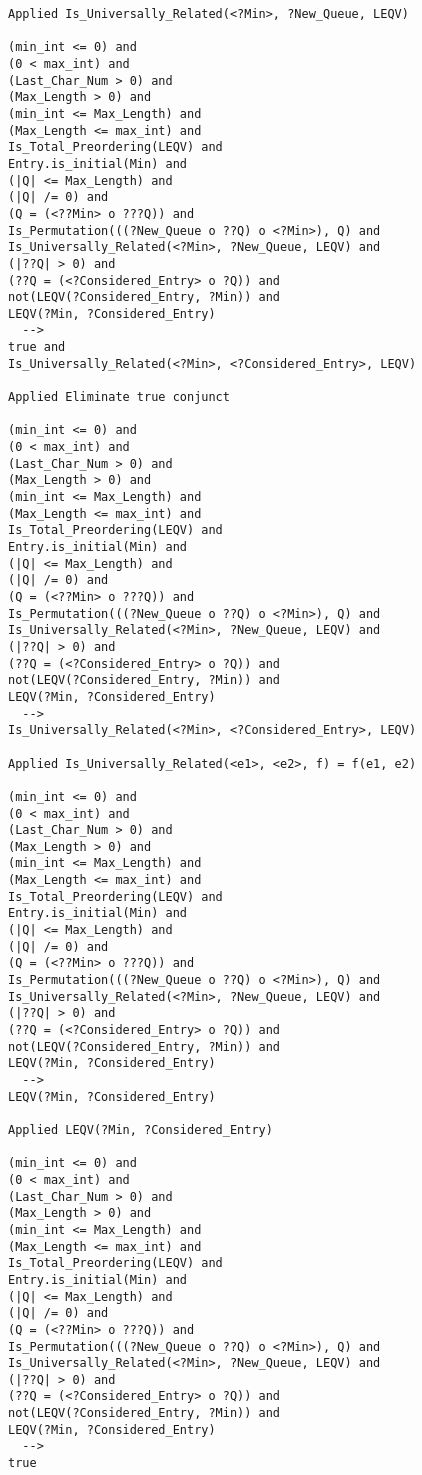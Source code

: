 \begin{lstlisting}[language=resolve]
Applied Is_Universally_Related(<?Min>, ?New_Queue, LEQV)

(min_int <= 0) and
(0 < max_int) and
(Last_Char_Num > 0) and
(Max_Length > 0) and
(min_int <= Max_Length) and
(Max_Length <= max_int) and
Is_Total_Preordering(LEQV) and
Entry.is_initial(Min) and
(|Q| <= Max_Length) and
(|Q| /= 0) and
(Q = (<??Min> o ???Q)) and
Is_Permutation(((?New_Queue o ??Q) o <?Min>), Q) and
Is_Universally_Related(<?Min>, ?New_Queue, LEQV) and
(|??Q| > 0) and
(??Q = (<?Considered_Entry> o ?Q)) and
not(LEQV(?Considered_Entry, ?Min)) and
LEQV(?Min, ?Considered_Entry)
  -->
true and
Is_Universally_Related(<?Min>, <?Considered_Entry>, LEQV)

Applied Eliminate true conjunct

(min_int <= 0) and
(0 < max_int) and
(Last_Char_Num > 0) and
(Max_Length > 0) and
(min_int <= Max_Length) and
(Max_Length <= max_int) and
Is_Total_Preordering(LEQV) and
Entry.is_initial(Min) and
(|Q| <= Max_Length) and
(|Q| /= 0) and
(Q = (<??Min> o ???Q)) and
Is_Permutation(((?New_Queue o ??Q) o <?Min>), Q) and
Is_Universally_Related(<?Min>, ?New_Queue, LEQV) and
(|??Q| > 0) and
(??Q = (<?Considered_Entry> o ?Q)) and
not(LEQV(?Considered_Entry, ?Min)) and
LEQV(?Min, ?Considered_Entry)
  -->
Is_Universally_Related(<?Min>, <?Considered_Entry>, LEQV)

Applied Is_Universally_Related(<e1>, <e2>, f) = f(e1, e2)

(min_int <= 0) and
(0 < max_int) and
(Last_Char_Num > 0) and
(Max_Length > 0) and
(min_int <= Max_Length) and
(Max_Length <= max_int) and
Is_Total_Preordering(LEQV) and
Entry.is_initial(Min) and
(|Q| <= Max_Length) and
(|Q| /= 0) and
(Q = (<??Min> o ???Q)) and
Is_Permutation(((?New_Queue o ??Q) o <?Min>), Q) and
Is_Universally_Related(<?Min>, ?New_Queue, LEQV) and
(|??Q| > 0) and
(??Q = (<?Considered_Entry> o ?Q)) and
not(LEQV(?Considered_Entry, ?Min)) and
LEQV(?Min, ?Considered_Entry)
  -->
LEQV(?Min, ?Considered_Entry)

Applied LEQV(?Min, ?Considered_Entry)

(min_int <= 0) and
(0 < max_int) and
(Last_Char_Num > 0) and
(Max_Length > 0) and
(min_int <= Max_Length) and
(Max_Length <= max_int) and
Is_Total_Preordering(LEQV) and
Entry.is_initial(Min) and
(|Q| <= Max_Length) and
(|Q| /= 0) and
(Q = (<??Min> o ???Q)) and
Is_Permutation(((?New_Queue o ??Q) o <?Min>), Q) and
Is_Universally_Related(<?Min>, ?New_Queue, LEQV) and
(|??Q| > 0) and
(??Q = (<?Considered_Entry> o ?Q)) and
not(LEQV(?Considered_Entry, ?Min)) and
LEQV(?Min, ?Considered_Entry)
  -->
true


\end{lstlisting}
